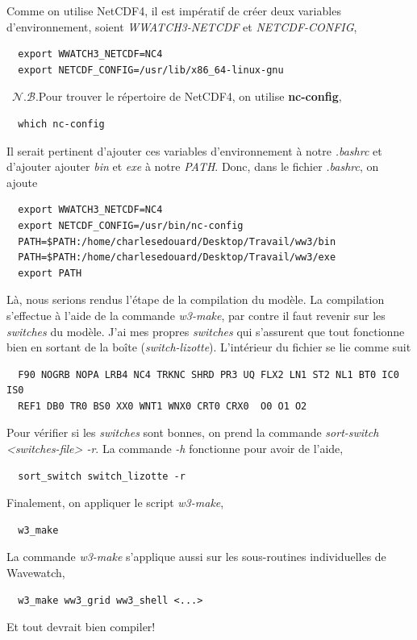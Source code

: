 \documentclass[10pt]{article}
\numberwithin{equation}{section}
\newcommand{\nb}{\raisebox{0.8pt}{\scriptsize\textleaf}\ $\mathscr{N. B.}$\hspace{4pt}}
\begin{document}
Comme on utilise NetCDF4, il est impératif de créer deux variables d'environnement, soient \emph{WWATCH3-NETCDF} et \emph{NETCDF-CONFIG}, 
\begin{verbatim}
  export WWATCH3_NETCDF=NC4
  export NETCDF_CONFIG=/usr/lib/x86_64-linux-gnu
\end{verbatim}

\nb Pour trouver le répertoire de NetCDF4, on utilise \textbf{nc-config}, 
\begin{verbatim}
  which nc-config
\end{verbatim}

Il serait pertinent d'ajouter ces variables d'environnement à notre \emph{.bashrc} et d'ajouter ajouter \emph{bin} et \emph{exe} à notre \emph{PATH}.
Donc, dans le fichier \emph{.bashrc}, on ajoute
\begin{verbatim}
  export WWATCH3_NETCDF=NC4
  export NETCDF_CONFIG=/usr/bin/nc-config
  PATH=$PATH:/home/charlesedouard/Desktop/Travail/ww3/bin
  PATH=$PATH:/home/charlesedouard/Desktop/Travail/ww3/exe
  export PATH
\end{verbatim}
Là, nous serions rendus l'étape de la compilation du modèle.
La compilation s'effectue à l'aide de la commande \emph{w3-make}, par contre il faut revenir sur les \emph{switches} du modèle.
J'ai mes propres \emph{switches} qui s'assurent que tout fonctionne bien en sortant de la boîte (\emph{switch-lizotte}).
L'intérieur du fichier se lie comme suit
\begin{verbatim}
  F90 NOGRB NOPA LRB4 NC4 TRKNC SHRD PR3 UQ FLX2 LN1 ST2 NL1 BT0 IC0 IS0
  REF1 DB0 TR0 BS0 XX0 WNT1 WNX0 CRT0 CRX0  O0 O1 O2
\end{verbatim}
Pour vérifier si les \emph{switches} sont bonnes, on prend la commande \emph{sort-switch <switches-file> -r}.
La commande \emph{-h} fonctionne pour avoir de l'aide,
\begin{verbatim}
  sort_switch switch_lizotte -r
\end{verbatim}
Finalement, on appliquer le script \emph{w3-make},
\begin{verbatim}
  w3_make
\end{verbatim}
La commande \emph{w3-make} s'applique aussi sur les sous-routines individuelles de Wavewatch,
\begin{verbatim}
  w3_make ww3_grid ww3_shell <...>
\end{verbatim}
Et tout devrait bien compiler!
\end{document}
